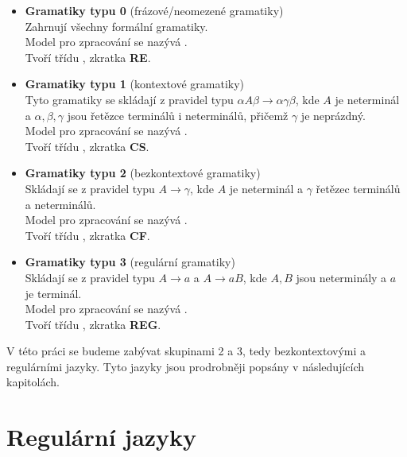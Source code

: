 \begin{itemize}
  \item \textbf{Gramatiky typu 0} (frázové/neomezené gramatiky)\\
  Zahrnují všechny formální gramatiky.\\
  Model pro zpracování se nazývá .\\
  Tvoří třídu , zkratka \textbf{RE}.

  \item \textbf{Gramatiky typu 1} (kontextové gramatiky)\\
  Tyto gramatiky se skládají z pravidel typu $\alpha A\beta \rightarrow \alpha \gamma \beta$,
  kde $A$ je neterminál a $\alpha, \beta, \gamma$ jsou řetězce terminálů i neterminálů,
  přičemž $\gamma$ je neprázdný.\\
  Model pro zpracování se nazývá .\\
  Tvoří třídu , zkratka \textbf{CS}.

  \item \textbf{Gramatiky typu 2} (bezkontextové gramatiky)\\
  Skládají se z pravidel typu $A \rightarrow \gamma$, kde $A$ je neterminál a
  $\gamma$ řetězec terminálů a neterminálů.\\
  Model pro zpracování se nazývá .\\
  Tvoří třídu , zkratka \textbf{CF}.

  \item \textbf{Gramatiky typu 3} (regulární gramatiky)\\
  Skládají se z pravidel typu $A \rightarrow a$ a $A \rightarrow aB$,
  kde $A, B$ jsou neterminály a $a$ je terminál.\\
  Model pro zpracování se nazývá .\\
  Tvoří třídu , zkratka \textbf{REG}.
\end{itemize}

V této práci se budeme zabývat skupinami 2 a 3,
tedy bezkontextovými a regulárními jazyky. Tyto jazyky jsou prodrobněji
popsány v následujících kapitolách.

\section{Regulární jazyky}

